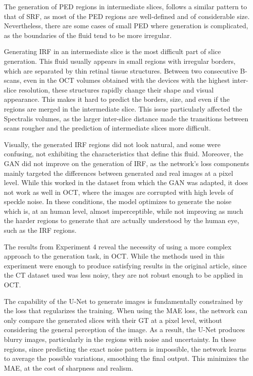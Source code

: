 \par
The generation of PED regions in intermediate slices, follows a similar pattern to that of SRF, as most of the PED regions are well-defined and of considerable size. Nevertheless, there are some cases of small PED where generation is complicated, as the boundaries of the fluid tend to be more irregular.
\par
Generating IRF in an intermediate slice is the most difficult part of slice generation. This fluid usually appears in small regions with irregular borders, which are separated by thin retinal tissue structures. Between two consecutive B-scans, even in the OCT volumes obtained with the devices with the highest inter-slice resolution, these structures rapidly change their shape and visual appearance. This makes it hard to predict the borders, size, and even if the regions are merged in the intermediate slice. This issue particularly affected the Spectralis volumes, as the larger inter-slice distance made the transitions between scans rougher and the prediction of intermediate slices more difficult.
\par
Visually, the generated IRF regions did not look natural, and some were confusing, not exhibiting the characteristics that define this fluid. Moreover, the GAN did not improve on the generation of IRF, as the network's loss components mainly targeted the differences between generated and real images at a pixel level. While this worked in the dataset from which the GAN was adapted, it does not work as well in OCT, where the images are corrupted with high levels of speckle noise. In these conditions, the model optimizes to generate the noise which is, at an human level, almost imperceptible, while not improving as much the harder regions to generate that are actually understood by the human eye, such as the IRF regions.
\par
The results from Experiment 4 reveal the necessity of using a more complex approach to the generation task, in OCT. While the methods used in this experiment were enough to produce satisfying results in the original article, since the CT dataset used was less noisy, they are not robust enough to be applied in OCT.
\par
The capability of the U-Net to generate images is fundamentally constrained by the loss that regularizes the training. When using the MAE loss, the network can only compare the generated slices with their GT at a pixel level, without considering the general perception of the image. As a result, the U-Net produces blurry images, particularly in the regions with noise and uncertainty. In these regions, since predicting the exact noise pattern is impossible, the network learns to average the possible variations, smoothing the final output. This minimizes the MAE, at the cost of sharpness and realism.
